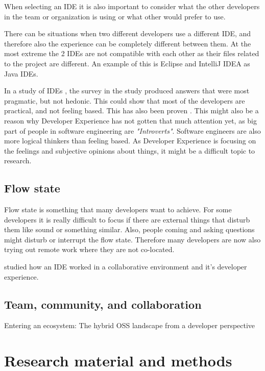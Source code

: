 \documentclass[english, 12pt, a4paper, sci, utf8, a-1b, online]{aaltothesis}
\begin{document}
When selecting an IDE it is also important to consider what the other developers in the team or organization is using or what other would prefer to use.

There can be situations when two different developers use a different IDE, and therefore also the experience can be completely different between them. At the most extreme the 2 IDEs are not compatible with each other as their files related to the project are different. An example of this is Eclipse and IntelliJ IDEA as Java IDEs.

In a study of IDEs \cite{software-developers-as-users}, the survey in the study produced answers that were most pragmatic, but not hedonic. This could show that most of the developers are practical, and not feeling based. This has also been proven \cite{personality-software}. This might also be a reason why Developer Experience has not gotten that much attention yet, as big part of people in software engineering are \textit{"Introverts"}. Software engineers are also more logical thinkers than feeling based. As Developer Experience is focusing on the feelings and subjective opinions about things, it might be a difficult topic to research.

\subsection{Flow state}

Flow state is something that many developers want to achieve. For some developers it is really difficult to focus if there are external things that disturb them like sound or something similar. Also, people coming and asking questions might disturb or interrupt the flow state. Therefore many developers are now also trying out remote work where they are not co-located.

\cite{design-framework-enchancing} studied how an IDE worked in a collaborative environment and it's developer experience.

\subsection{Team, community, and collaboration}

{\color{gray} Entering an ecosystem: The hybrid OSS landscape from a developer perspective}

\clearpage
\section{Research material and methods}
\end{document}

